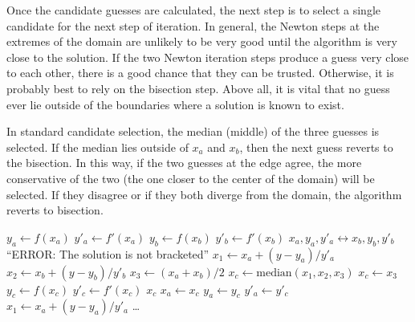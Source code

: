 Once the candidate guesses are calculated, the next step is to select a single candidate for the next step of iteration.  In general, the Newton steps at the extremes of the domain are unlikely to be very good until the algorithm is very close to the solution.  If the two Newton iteration steps produce a guess very close to each other, there is a good chance that they can be trusted.  Otherwise, it is probably best to rely on the bisection step.  Above all, it is vital that no guess ever lie outside of the boundaries where a solution is known to exist.

In standard candidate selection, the median (middle) of the three guesses is selected.  If the median lies outside of $x_a$ and $x_b$, then the next guess reverts to the bisection.  In this way, if the two guesses at the edge agree, the more conservative of the two (the one closer to the center of the domain) will be selected.  If they disagree or if they both diverge from the domain, the algorithm reverts to bisection.

\begin{algorithm}
\caption{HYBRID1: Hybrid bisection and Newton iteration}\label{alg:hybrid1}
\begin{algorithmic}
\State $y_a \gets f(x_a)$   
\State $y'_a \gets f'(x_a)$
\State $y_b \gets f(x_b)$
\State $y'_b \gets f'(x_b)$
    \State $x_a,y_a,y'_a \leftrightarrow x_b,y_b,y'_b$  
\EndIf
{}
    \State \Return ``ERROR: The solution is not bracketed''
\EndIf
\State $x_1 \gets x_a + (y-y_a)/y'_a$   
\State $x_2 \gets x_b + (y-y_b)/y'_b$
\State $x_3 \gets (x_a + x_b)/2$
     
    \State $x_c \gets \mathrm{median}(x_1,x_2,x_3)$ 
     
        \State $x_c \gets x_3$ 
    \EndIf
    \State $y_c \gets f(x_c)$ 
    \State $y'_c\gets f'(x_c)$ 
     
        \State \Return $x_c$
    \EndIf
     
        \State $x_a \gets x_c$ 
        \State $y_a \gets y_c$
        \State $y'_a \gets y'_c$
        \State $x_1 \gets x_a + (y - y_a)/y'_a$ 
        \State \ldots
{}
\end{algorithmic}
\end{algorithm}

